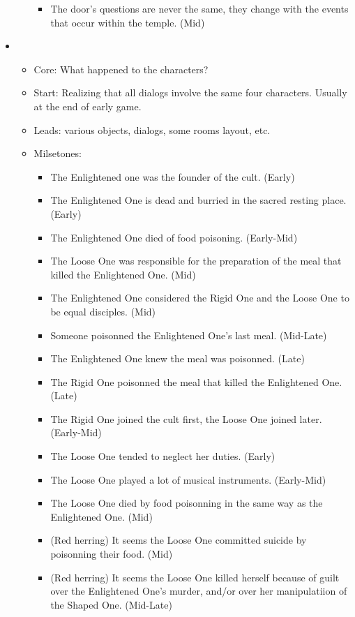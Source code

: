 \documentclass{scrartcl}
\let\emph\relax %
\begin{document}
\begin{itemize}
\begin{itemize}
\begin{itemize}
						\item The door's questions are never the same, they change with the events that occur within the temple. (Mid)
					\end{itemize}
				\end{itemize}
			\item \emph{Each Character's Fate}
				\begin{itemize}
					\item Core: What happened to the characters?
					\item Start: Realizing that all dialogs involve the same four characters. Usually at the end of early game.
					\item Leads: various objects, dialogs, some rooms layout, etc.
					\item Milsetones:
						\begin{itemize}
							\item The Enlightened one was the founder of the cult. (Early)
							\item The Enlightened One is dead and burried in the sacred resting place. (Early)
							\item The Enlightened One died of food poisoning. (Early-Mid)
							\item The Loose One was responsible for the preparation of the meal that killed the Enlightened One. (Mid)
							\item The Enlightened One considered the Rigid One and the Loose One to be equal disciples. (Mid)
							\item Someone poisonned the Enlightened One's last meal. (Mid-Late)
							\item The Enlightened One knew the meal was poisonned.	(Late)
							\item The Rigid One poisonned the meal that killed the Enlightened One. (Late)
							\item The Rigid One joined the cult first, the Loose One joined later. (Early-Mid)
							\item The Loose One tended to neglect her duties. (Early)
							\item The Loose One played a lot of musical instruments. (Early-Mid)
							\item The Loose One died by food poisonning in the same way as the Enlightened One. (Mid)
							\item (Red herring) It seems the Loose One committed suicide by poisonning their food. (Mid)
							\item (Red herring) It seems the Loose One killed herself because of guilt over the Enlightened One's murder, and/or over her manipulatiion of the Shaped One. (Mid-Late)

\end{itemize}
\end{itemize}
\end{itemize}
\end{document}
